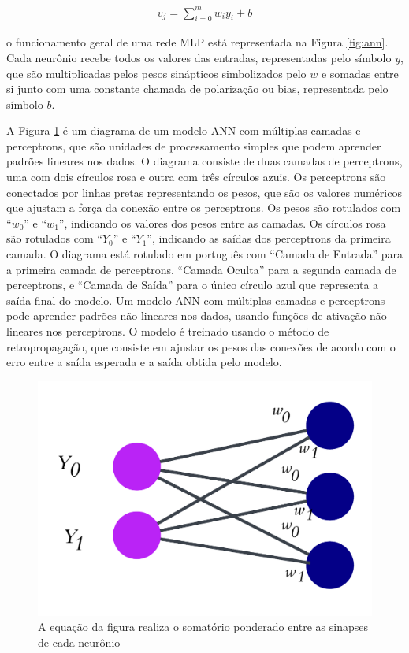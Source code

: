 \begin{eqnarray}
	v_j=\sum_{i=0}^m w_i y_i+b\label{eq:ann}
\end{eqnarray}

\noindent o funcionamento geral de uma rede MLP está representada na Figura \ref{fig:ann}. Cada neurônio recebe todos os valores das entradas, representadas pelo símbolo $y$, que são multiplicadas pelos pesos sinápticos simbolizados pelo $w$ e somadas entre si junto com uma constante chamada de polarização ou bias, representada pelo símbolo $b$.

A Figura \ref{fig:ann1} é um diagrama de um modelo ANN com múltiplas camadas e perceptrons, que são unidades de processamento simples que podem aprender padrões lineares nos dados.
O diagrama consiste de duas camadas de perceptrons, uma com dois círculos rosa e outra com três círculos azuis. Os perceptrons são conectados por linhas pretas representando os pesos, que são os valores numéricos que ajustam a força da conexão entre os perceptrons.
Os pesos são rotulados com ``$w_0$'' e ``$w_1$'', indicando os valores dos pesos entre as camadas. Os círculos rosa são rotulados com ``$Y_0$'' e ``$Y_1$'', indicando as saídas dos perceptrons da primeira camada.
O diagrama está rotulado em português com ``Camada de Entrada'' para a primeira camada de perceptrons, ``Camada Oculta'' para a segunda camada de perceptrons, e ``Camada de Saída'' para o único círculo azul que representa a saída final do modelo.
Um modelo ANN com múltiplas camadas e perceptrons pode aprender padrões não lineares nos dados, usando funções de ativação não lineares nos perceptrons. O modelo é treinado usando o método de retropropagação, que consiste em ajustar os pesos das conexões de acordo com o erro entre a saída esperada e a saída obtida pelo modelo.

\begin{figure}[!htb]
	\centering
	\caption{A equação da figura realiza o somatório ponderado entre as sinapses de cada neurônio}
	\includegraphics[width=0.4\linewidth]{Apendices/Figuras/modelagem-24h/ann1}
	
	\label{fig:ann1}
	
\end{figure}




